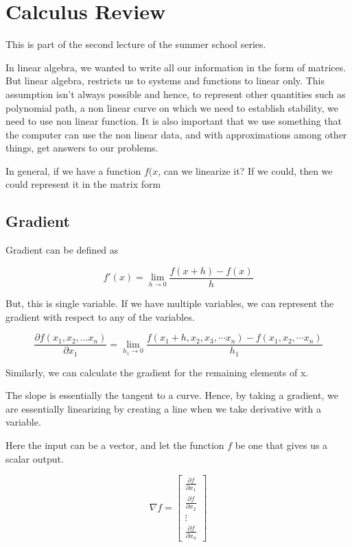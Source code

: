 \chapter{Calculus Review}

This is part of the second lecture of the summer school series.

In linear algebra, we wanted to write all our information in the form of matrices. But linear algebra, restricts us to systems and functions to linear only. This assumption isn't always possible and hence, to represent other quantities such as polynomial path, a non linear curve on which we need to establish stability, we need to use non linear function. It is also important that we use something that the computer can use the non linear data, and with approximations among other things, get answers to our problems.

In general, if we have a function $f(x$, can we linearize it? If we could, then we could represent it in the matrix form

\section{Gradient}

Gradient can be defined as 

\begin{equation}
    f'(x) = \lim_{h \to 0} \frac{f(x+h) - f(x)}{h}
\end{equation}

But, this is single variable. If we have multiple variables, we can represent the gradient with respect to any of the variables.

\begin{equation}
    \frac{\partial f(x_1, x_2, ... x_n)}{\partial x_1} = \lim_{h_1 \to 0} \frac{f(x_1 + h, x_2, x_3, \cdots x_n) - f(x_1, x_2, \cdots x_n)}{h_1}
\end{equation}

Similarly, we can calculate the gradient for the remaining elements of x.

The slope is essentially the tangent to a curve. Hence, by taking a gradient, we are essentially linearizing by creating a line when we take derivative with a variable.

Here the input can be a vector, and let the function $f$ be one that gives us a scalar output. 

\begin{equation}
\nabla f =
\begin{bmatrix}
\frac{\partial f}{\partial x_1} \\
\frac{\partial f}{\partial x_2} \\
\vdots \\
\frac{\partial f}{\partial x_n}
\end{bmatrix}
\end{equation}

